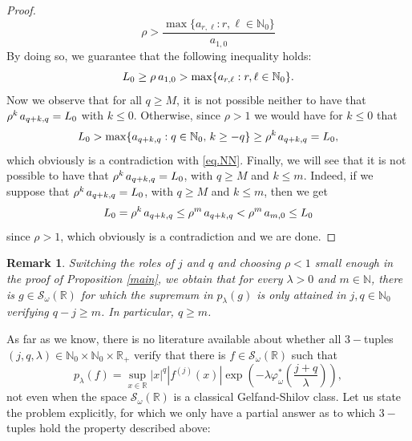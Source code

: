 \documentclass[12pt,reqno]{amsart} %
\newtheorem{remark}[theorem]{Remark}
\numberwithin{equation}{section}
\begin{document}
\begin{proof}
				\begin{equation*}
						\rho>\frac{\max\{a_{r,\ell}: r, \ell\in\mathbb{N}_0\}}{a_{1,0}}
					\end{equation*} 
				By doing so, we guarantee that the following inequality holds: 
				\begin{equation}\label{eq.NN}
						L_0\geq \rho \hspace{0.07cm}a_{1,0} >\max\{a_{r,\ell}: r, \ell\in\mathbb{N}_0\}.
					\end{equation}
					Now we observe that for all $q\geq M$, it is not possible neither to have that $\rho^{k}\hspace{0.05cm} a_{q+k,q}=L_0$ with $k\leq 0$. Otherwise, since $\rho>1$ we would have for $k\leq 0$ that \begin{equation*}
						L_0 > \max\{a_{q+k,q}: q\in\mathbb{N}_0, \hspace{0.05cm}k\geq -q\}\geq \rho^{k}\hspace{0.04cm} a_{q+k,q}=L_0,
					\end{equation*} which obviously is a contradiction with \eqref{eq.NN}. Finally, we will see that it is not possible to have that $\rho^{k} \hspace{0.05cm}a_{q+k,q}=L_0$, with $q\geq M$ and $k\leq m$. Indeed, if we suppose that $\rho^{k} \hspace{0.05cm}a_{q+k,q}=L_0$, with $q\geq M$ and $k\leq m$, then we get 
				\begin{equation*}
						L_0=\rho^k \hspace{0.05cm}a_{q+k,q}\leq \rho^m\hspace{0.05cm} a_{q+k,q}<\rho^m \hspace{0.05cm}a_{m,0}\leq L_0
					\end{equation*} since $\rho>1$, which obviously is a contradiction and we are done.
				\end{proof}
				
				
				\begin{remark}\label{Remark 3}
					Switching the roles of $j$ and $q$ and choosing $\rho<1$ small enough in the proof of Proposition \ref{main}, we obtain that for every $\lambda>0$ and $m\in\mathbb{N}$, there is $g\in \mathcal{S}_\omega(\mathbb{R})$ for which the supremum in $p_\lambda(g)$ is only attained in $j,q\in\mathbb{N}_0$ verifying $q-j\geq m$. In particular, $q\geq m$.  
				\end{remark}
				As far as we know, there is no literature available about whether all $3-$tuples $(j,q,\lambda)\in\mathbb{N}_0\times \mathbb{N}_0\times \mathbb{R}_+$ verify that there is $f\in \mathcal{S}_\omega(\mathbb{R})$ such that $$
				p_\lambda(f)=\sup_{x\in\mathbb{R}} |x|^q |f^{(j)}(x)|  \exp\left(-\lambda \varphi_\omega^*\left(\frac{j+q}{\lambda}\right)\right),$$
				 not even when the space $\mathcal{S}_\omega(\mathbb{R})$ is a classical Gelfand-Shilov class. Let us state the problem explicitly, for which we only have a partial answer as to which $3-$tuples hold the property described above:
				
\end{document}
